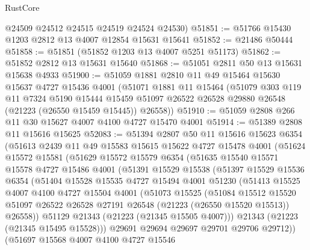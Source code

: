 \begin{lexlean}{RustCore}
\begin{coremodule}
      @24509
      @24512
      @24515
      @24519
      @24524
      @24530)
@51851 := @51766 @15430 @1203 @2812 @13 @4007 @12854 @15631 @15641
@51852 := @21486 @50444
@51858 := @51851 (@51852 @1203 @13 @4007 @5251 @51173)
@51862 := @51852 @2812 @13 @15631 @15640
@51868 := @51051 @2811 @50 @13 @15631 @15638 @4933
@51900 := @51059
    @1881
    @2810
    @11
    @49
    @15464
    @15630
    @15637
    @4727
    @15436
    @4001
    (@51071
      @1881
      @11
      @15464
      (@51079
        @303
        @119
        @11
        @7324
        @5190
        @15444
        @15459
        @51097
        @26522
        @26528
        @29880
        @26548
        (@21223 (@26550 @15459 @15445))
        @26558))
@51910 := @51059 @2808 @266 @11 @30 @15627 @4007 @4100 @4727 @15470 @4001
@51914 := @51389 @2808 @11 @15616 @15625
@52083 := @51394
    @2807
    @50
    @11
    @15616
    @15623
    @6354
    (@51613
      @2439
      @11
      @49
      @15583
      @15615
      @15622
      @4727
      @15478
      @4001
      (@51624
        @15572
        @15581
        (@51629
          @15572
          @15579
          @6354
          (@51635
            @15540
            @15571
            @15578
            @4727
            @15486
            @4001
            (@51391
              @15529
              @15538
              (@51397
                @15529
                @15536
                @6354
                (@51404
                  @15528
                  @15535
                  @4727
                  @15494
                  @4001
                  @51230
                  (@51413
                    @15525
                    @4007
                    @4100
                    @4727
                    @15504
                    @4001
                    (@51073
                      @15525
                      (@51084
                        @15512
                        @15520
                        @51097
                        @26522
                        @26528
                        @27191
                        @26548
                        (@21223 (@26550 @15520 @15513))
                        @26558))
                    @51129
                    @21343
                    (@21223 (@21345 @15505 @4007)))
                  @21343
                  (@21223 (@21345 @15495 @15528)))
                @29691
                @29694
                @29697
                @29701
                @29706
                @29712))
            (@51697
              @15568
              @4007
              @4100
              @4727
              @15546

\end{coremodule}
\end{lexlean}
